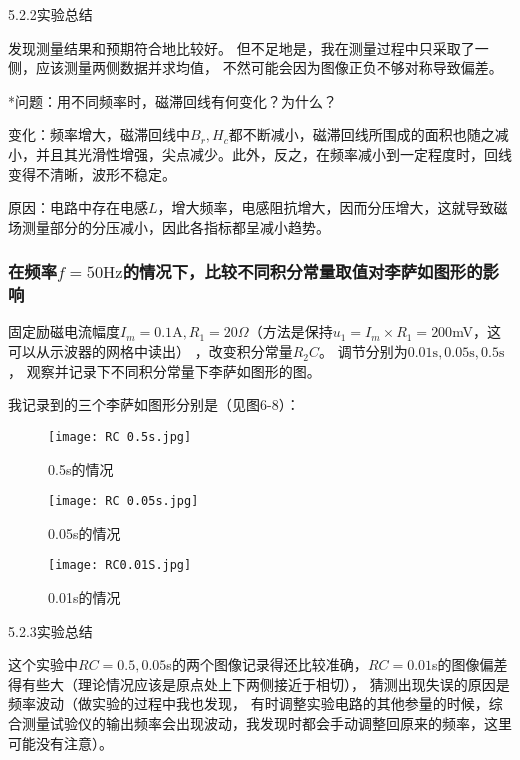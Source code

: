\documentclass[11pt]{article}
\begin{document}
\begin{center}
    \large{5.2.2实验总结}
\end{center}

发现测量结果和预期符合地比较好。
但不足地是，我在测量过程中只采取了一侧，应该测量两侧数据并求均值，
不然可能会因为图像正负不够对称导致偏差。

*问题：用不同频率时，磁滞回线有何变化？为什么？

变化：频率增大，磁滞回线中$B_r,H_c$都不断减小，磁滞回线所围成的面积也随之减小，并且其光滑性增强，尖点减少。此外，反之，在频率减小到一定程度时，回线变得不清晰，波形不稳定。

原因：电路中存在电感$L$，增大频率，电感阻抗增大，因而分压增大，这就导致磁场测量部分的分压减小，因此各指标都呈减小趋势。






\subsubsection{在频率$f=50\text{Hz}$的情况下，比较不同积分常量取值对李萨如图形的影响}

固定励磁电流幅度$I_m=0.1\text{A},R_1=20\Omega$（方法是保持$u_1=I_m\times R_1=200$mV，这可以从示波器的网格中读出）
，改变积分常量$R_2C$。
调节分别为$0.01\text{s},0.05\text{s},0.5\text{s}$，
观察并记录下不同积分常量下李萨如图形的图。

我记录到的三个李萨如图形分别是（见图6-8）：

\begin{figure}[H]
    \centering
    \texttt{[image: RC 0.5s.jpg]}
    \caption{0.5s的情况}
\end{figure}

\begin{figure}[H]
    \centering
    \texttt{[image: RC 0.05s.jpg]}
    \caption{0.05s的情况}
\end{figure}

\begin{figure}[H]
    \centering
    \texttt{[image: RC0.01S.jpg]}
    \caption{0.01s的情况}
\end{figure}



\newpage
\begin{center}
    \large{5.2.3实验总结}
\end{center}

这个实验中$RC=0.5,0.05$s的两个图像记录得还比较准确，$RC=0.01$s的图像偏差得有些大（理论情况应该是原点处上下两侧接近于相切），
猜测出现失误的原因是频率波动（做实验的过程中我也发现，
有时调整实验电路的其他参量的时候，综合测量试验仪的输出频率会出现波动，我发现时都会手动调整回原来的频率，这里可能没有注意）。
\end{document}
